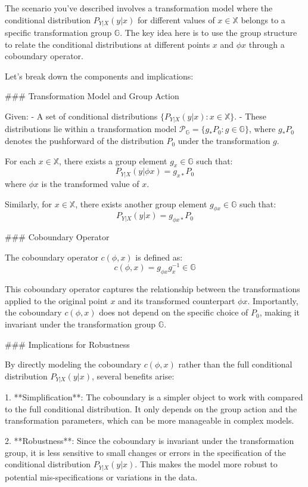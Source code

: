 The scenario you've described involves a transformation model where the conditional distribution \( P_{Y|X}(y|x) \) for different values of \( x \in \mathbb{X} \) belongs to a specific transformation group \(\mathbb{G}\). The key idea here is to use the group structure to relate the conditional distributions at different points \( x \) and \(\phi x\) through a coboundary operator.

Let's break down the components and implications:

### Transformation Model and Group Action

Given:
- A set of conditional distributions \(\{P_{Y|X}(y|x) : x \in \mathbb{X}\}\).
- These distributions lie within a transformation model \(\mathcal{P}_{\mathbb{G}} = \{g_*P_0 : g \in \mathbb{G}\}\), where \(g_*P_0\) denotes the pushforward of the distribution \(P_0\) under the transformation \(g\).

For each \(x \in \mathbb{X}\), there exists a group element \(g_x \in \mathbb{G}\) such that:
\[ P_{Y|X}(y|\phi x) = g_{x*}P_0 \]
where \(\phi x\) is the transformed value of \(x\).

Similarly, for \(x \in \mathbb{X}\), there exists another group element \(g_{\phi x} \in \mathbb{G}\) such that:
\[ P_{Y|X}(y|x) = g_{\phi x*}P_0 \]

### Coboundary Operator

The coboundary operator \(c(\phi, x)\) is defined as:
\[ c(\phi, x) = g_{\phi x}g_x^{-1} \in \mathbb{G} \]

This coboundary operator captures the relationship between the transformations applied to the original point \(x\) and its transformed counterpart \(\phi x\). Importantly, the coboundary \(c(\phi, x)\) does not depend on the specific choice of \(P_0\), making it invariant under the transformation group \(\mathbb{G}\).

### Implications for Robustness

By directly modeling the coboundary \(c(\phi, x)\) rather than the full conditional distribution \(P_{Y|X}(y|x)\), several benefits arise:

1. **Simplification**: The coboundary is a simpler object to work with compared to the full conditional distribution. It only depends on the group action and the transformation parameters, which can be more manageable in complex models.
   
2. **Robustness**: Since the coboundary is invariant under the transformation group, it is less sensitive to small changes or errors in the specification of the conditional distribution \(P_{Y|X}(y|x)\). This makes the model more robust to potential mis-specifications or variations in the data.

